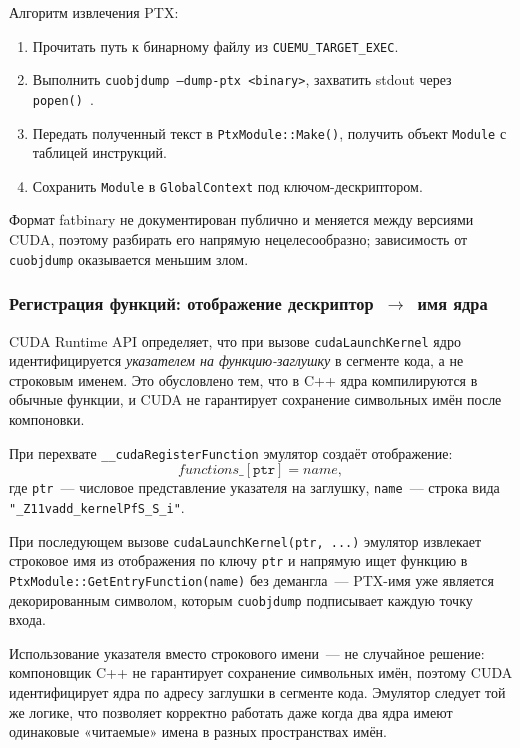 Алгоритм извлечения PTX:
\begin{enumerate}
  \item Прочитать путь к бинарному файлу из \texttt{CUEMU\_TARGET\_EXEC}.
  \item Выполнить \texttt{cuobjdump --dump-ptx <binary>},
        захватить stdout через \texttt{popen()}~\cite{Stolyarov2011}.
  \item Передать полученный текст в \texttt{PtxModule::Make()},
        получить объект \texttt{Module} с таблицей инструкций.
  \item Сохранить \texttt{Module} в \texttt{GlobalContext}
        под ключом-дескриптором.
\end{enumerate}

Формат fatbinary не документирован публично и меняется между версиями
CUDA, поэтому разбирать его напрямую нецелесообразно; зависимость
от \texttt{cuobjdump} оказывается меньшим злом.

\subsubsection{Регистрация функций: отображение дескриптор~$\to$~имя ядра}

CUDA Runtime API определяет, что при вызове \texttt{cudaLaunchKernel}
ядро идентифицируется \textit{указателем на функцию-заглушку}
в сегменте кода, а не строковым именем. Это обусловлено тем, что
в C++ ядра компилируются в обычные функции, и CUDA не гарантирует
сохранение символьных имён после компоновки.

При перехвате \texttt{\_\_cudaRegisterFunction} эмулятор создаёт
отображение:
\begin{equation}
  \mathit{functions\_}[\mathtt{ptr}] = \mathit{name},
\end{equation}
где \texttt{ptr}~--- числовое представление указателя на заглушку,
\texttt{name}~--- строка вида \texttt{"\_Z11vadd\_kernelPfS\_S\_i"}.

При последующем вызове \texttt{cudaLaunchKernel(ptr, ...)} эмулятор
извлекает строковое имя из отображения по ключу \texttt{ptr}
и напрямую ищет функцию в \texttt{PtxModule::GetEntryFunction(name)}
без демангла~--- PTX-имя уже является декорированным символом,
которым \texttt{cuobjdump} подписывает каждую точку входа.

Использование указателя вместо строкового имени~--- не случайное решение:
компоновщик C++ не гарантирует сохранение символьных имён, поэтому CUDA
идентифицирует ядра по адресу заглушки в сегменте кода. Эмулятор
следует той же логике, что позволяет корректно работать даже когда
два ядра имеют одинаковые «читаемые» имена в разных пространствах имён.

